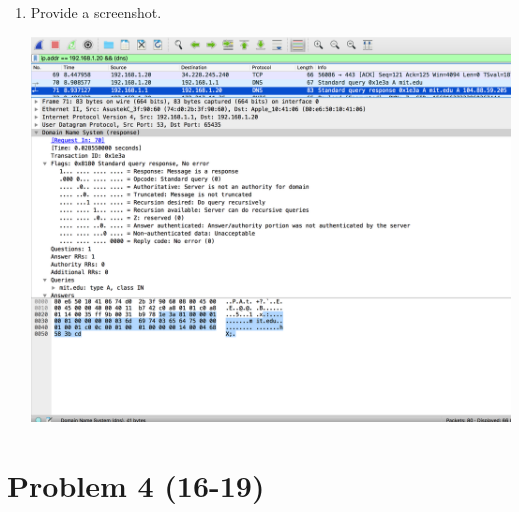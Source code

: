 \documentclass[letter,10pt]{article}
\begin{document}
\begin{enumerate}
\item Provide a screenshot.

\includegraphics[width=\textwidth]{./figures/hw6_screenshot_15.png}

\end{enumerate}

\section{Problem 4 (16-19)}
\end{document}
